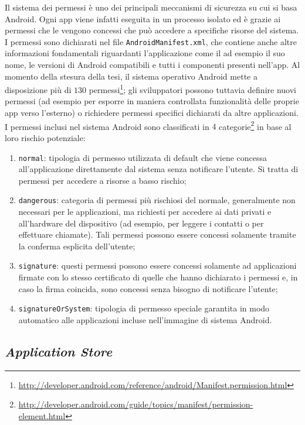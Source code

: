 \documentclass[12pt,a4paper,oneside]{article}
\begin{document}
Il sistema dei permessi è uno dei principali meccanismi di sicurezza su cui si basa Android. Ogni app viene infatti eseguita in un processo isolato ed è grazie ai permessi che le vengono concessi che può accedere a specifiche risorse del sistema. I permessi sono dichiarati nel file \texttt{AndroidManifest.xml}, che contiene anche altre informazioni fondamentali riguardanti l'applicazione come il ad esempio il suo nome, le versioni di Android compatibili e tutti i componenti presenti nell'app. Al momento della stesura della tesi, il sistema operativo Android mette a disposizione più di $130$ permessi\footnote{\url{http://developer.android.com/reference/android/Manifest.permission.html}}; gli sviluppatori possono tuttavia definire nuovi permessi (ad esempio per esporre in maniera controllata funzionalità delle proprie app verso l'esterno) o richiedere permessi specifici dichiarati da altre applicazioni. I permessi inclusi nel sistema Android sono classificati in $4$ categorie\footnote{\url{http://developer.android.com/guide/topics/manifest/permission-element.html}} in base al loro rischio potenziale:
\begin{enumerate}
    \item[1)]\texttt{normal}: tipologia di permesso utilizzata di default che viene concessa all'applicazione direttamente dal sistema senza notificare l'utente. Si tratta di permessi per accedere a risorse a basso rischio;
    \item[2)]\texttt{dangerous}: categoria di permessi più rischiosi del normale, generalmente non necessari per le applicazioni, ma richiesti per accedere ai dati privati e all'hardware del dispositivo (ad esempio, per leggere i contatti o per effettuare chiamate). Tali permessi possono essere concessi solamente tramite la conferma esplicita dell'utente;
    \item[3)]\texttt{signature}: questi permessi possono essere concessi solamente ad applicazioni firmate con lo stesso certificato di quelle che hanno dichiarato i permessi e, in caso la firma coincida, sono concessi senza bisogno di notificare l'utente;
    \item[4)]\texttt{signatureOrSystem}: tipologia di permesso speciale garantita in modo automatico alle applicazioni incluse nell'immagine di sistema Android.
\end{enumerate}



\subsection{\textit{Application Store}}
\end{document}
